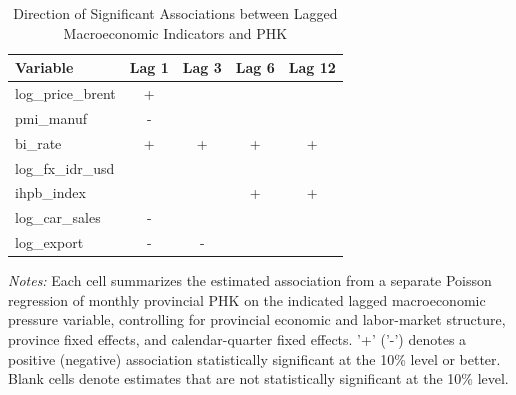 \begin{table}[htbp]
\centering
\caption{Direction of Significant Associations between Lagged Macroeconomic Indicators and PHK}
\small
\begin{tabular}{lcccc}
\toprule
Variable & Lag 1 & Lag 3 & Lag 6 & Lag 12 \\ \midrule
log\_price\_brent&+&&&\\
pmi\_manuf&-&&&\\
bi\_rate&+&+&+&+\\
log\_fx\_idr\_usd&&&&\\
ihpb\_index&&&+&+\\
log\_car\_sales&-&&&\\
log\_export&-&-&&\\
\bottomrule
\end{tabular}
\vspace{0.2cm}
\begin{minipage}{0.95\linewidth}
\footnotesize
\textit{Notes:} Each cell summarizes the estimated association from a separate Poisson regression of monthly provincial PHK on the indicated lagged macroeconomic pressure variable, controlling for provincial economic and labor-market structure, province fixed effects, and calendar-quarter fixed effects. '+' ('-') denotes a positive (negative) association statistically significant at the 10\% level or better. Blank cells denote estimates that are not statistically significant at the 10\% level.
\end{minipage}
\end{table}
